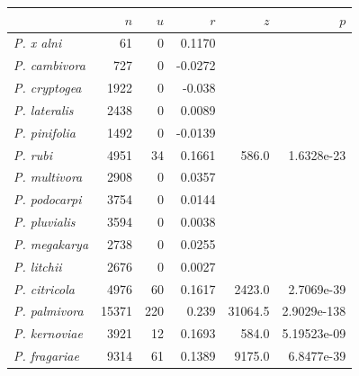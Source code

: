 \begin{longtable}{@{}lrrrrr@{}}
  \toprule
  \textbf{}                           & $\textbf{$n$}$ & \textbf{$u$} & \textbf{$r$} & \textbf{$z$} & \textbf{$p$}  \\ \midrule
  \endhead
  \textit{P. x alni}                  & 61         & 0          & 0.1170       &              &               \\
  \textit{P. cambivora}               & 727        & 0          & -0.0272      &              &               \\
  \textit{P. cryptogea}               & 1922       & 0          & -0.038       &              &               \\
  \textit{P. lateralis}               & 2438       & 0          & 0.0089       &              &               \\
  \textit{P. pinifolia}               & 1492       & 0          & -0.0139      &              &               \\
  \textit{P. rubi}                    & 4951       & 34         & 0.1661       & 586.0        & 1.6328e-23    \\
  \textit{P. multivora}               & 2908       & 0          & 0.0357       &              &               \\
  \textit{P. podocarpi}               & 3754       & 0          & 0.0144       &              &               \\
  \textit{P. pluvialis}               & 3594       & 0          & 0.0038       &              &               \\
  \textit{P. megakarya}               & 2738       & 0          & 0.0255       &              &               \\
  \textit{P. litchii}                 & 2676       & 0          & 0.0027       &              &               \\
  \textit{P. citricola}               & 4976       & 60         & 0.1617       & 2423.0       & 2.7069e-39   \\
  \textit{P. palmivora}               & 15371      & 220        & 0.239        & 31064.5      & 2.9029e-138 \\
  \textit{P. kernoviae}               & 3921       & 12         & 0.1693       & 584.0        & 5.19523e-09   \\
  \textit{P. fragariae}               & 9314       & 61         & 0.1389       & 9175.0       & 6.8477e-39    \\

\end{longtable}
